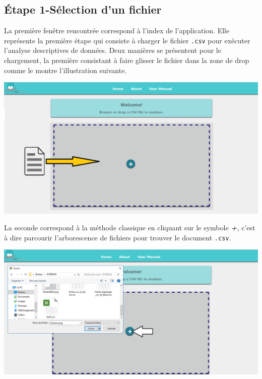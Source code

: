 	\subsection{Étape 1-Sélection d'un fichier}
		La première fenêtre rencontrée correspond à l'index de l'application. Elle représente la première étape qui consiste à charger le fichier \lstinline!.csv! pour exécuter l'analyse descriptives de données. 
		Deux manières se présentent pour le chargement, la première consistant à faire glisser le fichier dans la zone de drop comme le montre l'illustration suivante. \\
		
	\begin{center}\includegraphics[scale=0.45]{fenetreDragDrop.png}\end{center}
		  
		 La seconde correspond à la méthode classique en cliquant sur le symbole \textbf{\textit{+}}, c'est à dire parcourir l'arborescence de fichiers pour trouver le document \lstinline!.csv!.\\
		 
	\begin{center}\includegraphics[scale=0.45]{fenetreSGF.png}\end{center}
	
